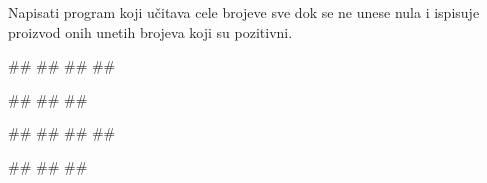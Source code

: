 \begin{Exercise}[label=PET_16] 
Napisati program koji učitava cele brojeve sve dok se ne unese
nula i ispisuje proizvod onih unetih brojeva koji su
pozitivni.  

\begin{miditest}
\begin{upotreba}{1}
#\naslovInt#
##
##
##
\end{upotreba}
\end{miditest}
\begin{miditest}
\begin{upotreba}{2}
#\naslovInt#
##
##
\end{upotreba}
\end{miditest}

\begin{miditest}
\begin{upotreba}{3}
#\naslovInt#
##
##
##
\end{upotreba}
\end{miditest}
\begin{miditest}
\begin{upotreba}{4}
#\naslovInt#
##
##
\end{upotreba}
\end{miditest}

\end{Exercise}
\ifresenja
\begin{Answer}[ref=PET_16]
\end{Answer}
\fi


